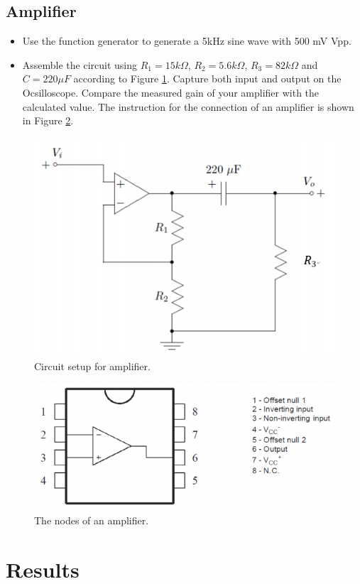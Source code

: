 \documentclass{article}
\begin{document}
\subsection{Amplifier}
\begin{itemize}
\item  Use the function generator to generate a 5kHz sine wave with 500 mV Vpp.
\item Assemble the circuit using $R_1 = 15k\Omega$, $R_2 = 5.6k\Omega$, $R_3 = 82k\Omega$ and $C = 220\mu F$ according to Figure \ref{setup2}. Capture both input and output on the Ocsilloscope. Compare the measured gain of your amplifier with the calculated value. The instruction for the connection of an amplifier is shown in Figure \ref{amp}.
\end{itemize}
\begin{figure}[htbp]
	\centering
	\includegraphics[width=0.7\linewidth]{fig11.png}
	\caption{Circuit setup for amplifier.}
	\label{setup2}
\end{figure}
\begin{figure}[htbp]
	\centering
	\includegraphics[width=0.7\linewidth]{fig12.png}
	\caption{The nodes of an amplifier.}
	\label{amp}
\end{figure}

\section{Results}
\end{document}
